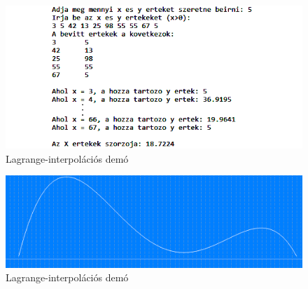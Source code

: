 \begin{figure}[h]
\centering
\includegraphics[scale=0.9]{kepek/lagrange_imp.png}
\caption{Lagrange-interpolációs demó}
\label{fig:lagrange_imp}
\end{figure}

\begin{figure}[h]
\centering
\includegraphics[scale=0.43]{kepek/lagrange_graphics.png}
\caption{Lagrange-interpolációs demó}
\label{fig:lagrange_demo}
\end{figure}

